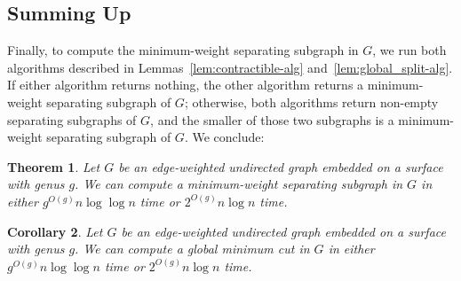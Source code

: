 \documentclass[11pt,twoside]{article}
\newtheorem{theorem}{Theorem}[section]
\newtheorem{corollary}[theorem]{Corollary}
\begin{document}
{%

\subsection{Summing Up}

Finally, to compute the minimum-weight separating subgraph in $G$, we run both  algorithms described in Lemmas~\ref{lem:contractible-alg} and~\ref{lem:global_split-alg}.  If either algorithm returns nothing, the other algorithm returns a minimum-weight separating subgraph of $G$; otherwise, both algorithms return non-empty separating subgraphs of $G$, and the smaller of those two subgraphs is a minimum-weight separating subgraph of $G$.  We conclude:

\begin{theorem}
Let $G$ be an edge-weighted undirected graph embedded on a surface with genus $g$.
We can compute a minimum-weight separating subgraph in $G$ in either $g^{O(g)} n \log \log n$ time or $2^{O(g)} n \log n$ time.
\end{theorem}

\begin{corollary}
Let $G$ be an edge-weighted undirected graph embedded on a surface with genus $g$.
We can compute a global minimum cut in $G$ in either $g^{O(g)} n \log \log n$ time or $2^{O(g)} n \log n$ time.
\end{corollary}


}
\end{document}
